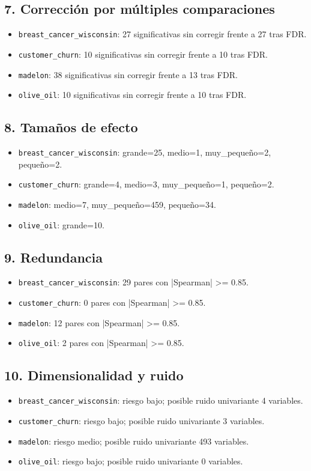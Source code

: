 \subsection{7. Corrección por múltiples comparaciones}
\begin{itemize}
\item \texttt{breast\_cancer\_wisconsin}: 27 significativas sin corregir frente a 27 tras FDR.
\item \texttt{customer\_churn}: 10 significativas sin corregir frente a 10 tras FDR.
\item \texttt{madelon}: 38 significativas sin corregir frente a 13 tras FDR.
\item \texttt{olive\_oil}: 10 significativas sin corregir frente a 10 tras FDR.
\end{itemize}

\subsection{8. Tamaños de efecto}
\begin{itemize}
\item \texttt{breast\_cancer\_wisconsin}: grande=25, medio=1, muy\_pequeño=2, pequeño=2.
\item \texttt{customer\_churn}: grande=4, medio=3, muy\_pequeño=1, pequeño=2.
\item \texttt{madelon}: medio=7, muy\_pequeño=459, pequeño=34.
\item \texttt{olive\_oil}: grande=10.
\end{itemize}

\subsection{9. Redundancia}
\begin{itemize}
\item \texttt{breast\_cancer\_wisconsin}: 29 pares con |Spearman| >= 0.85.
\item \texttt{customer\_churn}: 0 pares con |Spearman| >= 0.85.
\item \texttt{madelon}: 12 pares con |Spearman| >= 0.85.
\item \texttt{olive\_oil}: 2 pares con |Spearman| >= 0.85.
\end{itemize}

\subsection{10. Dimensionalidad y ruido}
\begin{itemize}
\item \texttt{breast\_cancer\_wisconsin}: riesgo bajo; posible ruido univariante 4 variables.
\item \texttt{customer\_churn}: riesgo bajo; posible ruido univariante 3 variables.
\item \texttt{madelon}: riesgo medio; posible ruido univariante 493 variables.
\item \texttt{olive\_oil}: riesgo bajo; posible ruido univariante 0 variables.
\end{itemize}

